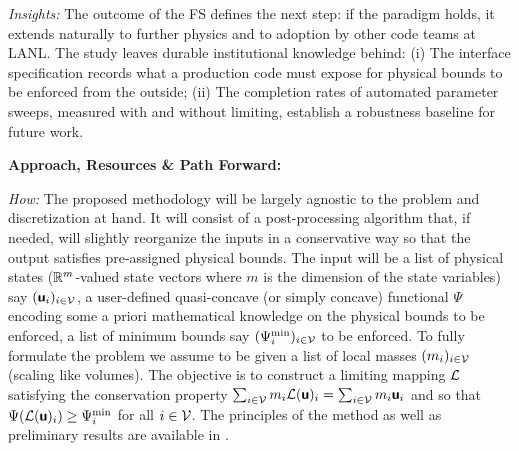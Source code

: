 \documentclass[12pt,twoside]{paper}
\begin{document}
\vspace*{0.5\baselineskip}

\textit{Insights:} The outcome of the FS defines the next step: if the
paradigm holds, it extends naturally to further physics and to adoption by
other code teams at LANL. The study leaves durable institutional knowledge
behind: (i) The interface specification records what a production code must
expose for physical bounds to be enforced from the outside; (ii) The
completion rates of automated parameter sweeps, measured with and without
limiting, establish a robustness baseline for future work.




\vspace*{0.5\baselineskip}
\textbf{Approach, Resources \& Path Forward:}
\vspace*{0.5\baselineskip}

\textit{How:} The proposed methodology will be largely agnostic to the
problem and discretization at hand. It will consist of a post-processing
algorithm that, if needed, will slightly reorganize the inputs in a
conservative way so that the output satisfies pre-assigned physical bounds.
The input will be a list of physical states (\ie ${\mathbb R}^m$-valued state
vectors where $m$ is the dimension of the state variables) say
$(\textsf{\textbf u}_i)_{i\in{\mathcal V}}$, a user-defined quasi-concave (or simply concave)
functional $\Psi$ encoding some a priori mathematical knowledge on the
physical bounds to be enforced, a list of minimum bounds say
$(\Psi_i^{\min})_{i\in{\mathcal V}}$ to be enforced. To fully formulate the
problem we assume to be given a list of local masses $(m_i)_{i\in{\mathcal V}}$
(scaling like volumes).
The objective
is to construct a limiting mapping ${\mathcal L} $ satisfying the conservation property
$\sum_{i\in{\mathcal V}} m_i{\mathcal L}(\textsf{\textbf u})_i
= \sum_{i\in{\mathcal V}} m_i\textsf{\textbf u}_i$ and so that
$\Psi({\mathcal L}(\textsf{\textbf u})_i)\ge \Psi_i^{\min}$ for all $i\in{\mathcal V}$. 
The principles of the method as well as
preliminary results are available in \cite{Guermond_arxiv_2026}.
\end{document}
